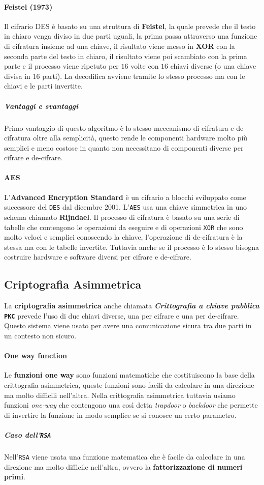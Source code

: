             \paragraph{Feistel (1973)}
                Il cifrario DES è basato su una struttura di \textbf{Feistel}, la quale prevede che il testo in chiaro venga diviso in due parti uguali, la prima passa attraverso una funzione di cifratura insieme ad una chiave, il risultato viene messo in \textbf{XOR} con la seconda parte del testo in chiaro, il risultato viene poi scambiato con la prima parte e il processo viene ripetuto per $16$ volte con $16$ chiavi diverse (o una chiave divisa in $16$ parti). La decodifica avviene tramite lo stesso processo ma con le chiavi e le parti invertite.
                \subparagraph{Vantaggi e svantaggi} Primo vantaggio di questo algoritmo è lo stesso meccanismo di cifratura e de-cifratura oltre alla semplicità, questo rende le componenti hardware molto più semplici e meno costose in quanto non necessitano di componenti diverse per cifrare e de-cifrare. 
            \paragraph{AES} 
                L'\textbf{Advanced Encryption Standard} è un cifrario a blocchi sviluppato come successore del \texttt{DES} dal dicembre 2001. L'\texttt{AES} usa una chiave simmetrica in uno schema chiamato \textbf{Rijndael}.\newline
                Il processo di cifratura è basato su una serie di tabelle che contengono le operazioni da eseguire e di operazioni \texttt{XOR} che sono molto veloci e semplici conoscendo la chiave, l'operazione di de-cifratura è la stessa ma con le tabelle invertite. Tuttavia anche se il processo è lo stesso bisogna costruire hardware e software diversi per cifrare e de-cifrare.
    \subsection{Criptografia Asimmetrica}
        La \textbf{criptografia asimmetrica} anche chiamata \textbf{\textit{Crittografia a chiave pubblica}} \textbf{\texttt{PKC}} prevede l'uso di due chiavi diverse, una per cifrare e una per de-cifrare. Questo sistema viene usato per avere una comunicazione sicura tra due parti in un contesto non sicuro.
        \paragraph{One way function} Le \textbf{funzioni one way} sono funzioni matematiche che costituiscono la base della crittografia asimmetrica, queste funzioni sono facili da calcolare in una direzione ma molto difficili nell'altra. Nella crittografia asimmetrica tuttavia usiamo funzioni \textit{one-way} che contengono una così detta \textit{trapdoor} o \textit{backdoor} che permette di invertire la funzione in modo semplice se si conosce un certo parametro.
        \subparagraph{Caso dell'\texttt{RSA}}
            Nell'\texttt{RSA} viene usata una funzione matematica che è facile da calcolare in una direzione ma molto difficile nell'altra, ovvero la \textbf{fattorizzazione di numeri primi}.
